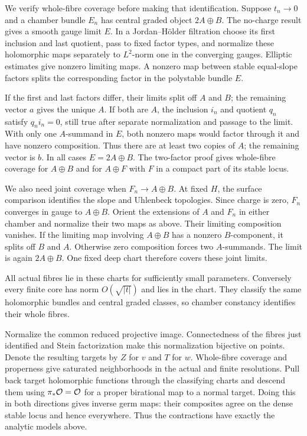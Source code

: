 We verify whole-fibre coverage before making that identification.
Suppose \(t_n\to0\) and a chamber bundle \(E_n\) has central
graded object \(2A\oplus B\). The no-charge result gives a smooth
gauge limit \(E\). In a Jordan--Hölder filtration choose its
first inclusion and last quotient, pass to fixed factor types,
and normalize these holomorphic maps separately to \(L^2\)-norm
one in the converging gauges. Elliptic estimates give nonzero
limiting maps. A nonzero map between stable equal-slope factors
splits the corresponding factor in the polystable bundle \(E\).

If the first and last factors differ, their limits split off
\(A\) and \(B\); the remaining vector \(a\) gives the unique \(A\).
If both are \(A\), the inclusion \(i_n\) and quotient \(q_n\)
satisfy \(q_ni_n=0\), still true after separate normalization
and passage to the limit. With only one \(A\)-summand in \(E\),
both nonzero maps would factor through it and have nonzero
composition. Thus there are at least two copies of \(A\);
the remaining vector is \(b\). In all cases \(E=2A\oplus B\).
The two-factor proof gives whole-fibre coverage for \(A\oplus B\)
and for \(A\oplus F\) with \(F\) in a compact part of its stable
locus.

We also need joint coverage when \(F_n\to A\oplus B\).
At fixed \(H\), the surface comparison
\cite[Theorem~4.11 and Corollary~4.15]{gstw} identifies the
slope and Uhlenbeck topologies. Since charge is zero, \(F_n\)
converges in gauge to \(A\oplus B\).
Orient the extensions of \(A\) and \(F_n\) in either chamber and
normalize their two maps as above. Their limiting composition
vanishes. If the limiting map involving \(A\oplus B\) has a
nonzero \(B\)-component, it splits off \(B\) and \(A\).
Otherwise zero composition forces two \(A\)-summands.
The limit is again \(2A\oplus B\).
One fixed deep chart therefore covers these joint limits.

All actual fibres lie in these charts for sufficiently small
parameters. Conversely every finite core has norm \(O(\sqrt{|t|})\)
and lies in the chart. They classify the same holomorphic bundles
and central graded classes, so chamber constancy identifies
their whole fibres.

Normalize the common reduced projective image. Connectedness of
the fibres just identified and Stein factorization make this
normalization bijective on points. Denote the resulting targets
by \(Z\) for \(v\) and \(T\) for \(w\).
Whole-fibre coverage and properness give saturated neighborhoods
in the actual and finite resolutions. Pull back target holomorphic
functions through the classifying charts and descend them using
\(\pi_*\mathcal O=\mathcal O\) for a proper birational map to a normal target.
Doing this in both directions gives inverse germ maps: their
composites agree on the dense stable locus and hence everywhere.
Thus the contractions have exactly the analytic models above.

